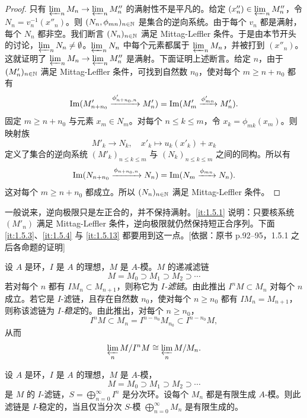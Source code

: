 \begin{proof}
只有 $\varprojlim_n M_n\to\varprojlim_n M''_n$ 的满射性不是平凡的。给定 $(x''_n)\in\varprojlim_n M''_n$，令 $N_n=v_n^{-1}(x''_n)$。则 $(N_n,\phi_{mn})_{n\in\mathbb{N}}$ 是集合的逆向系统。由于每个 $v_n$ 都是满射，每个 $N_n$ 都非空。我们断言 $(N_n)_{n\in\mathbb{N}}$ 满足 Mittag-Leffler 条件。于是由本节开头的讨论，$\varprojlim_n N_n\ne\emptyset$。$\varprojlim_n N_n$ 中每个元素都属于 $\varprojlim_n M_n$，并被打到 $(x''_n)$。这就证明了 $\varprojlim_n M_n\to\varprojlim_n M''_n$ 是满射。下面证明上述断言。给定 $n$，由于 $(M'_n)_{n\in\mathbb{N}}$ 满足 Mittag-Leffler 条件，可找到自然数 $n_0$，使对每个 $m\ge n+n_0$ 都有
\[
\operatorname{Im}(M'_{n+n_0}\xrightarrow{\phi'_{n+n_0,n}}M'_n)=\operatorname{Im}(M'_m\xrightarrow{\phi'_{mn}}M'_n).
\]
固定 $m\ge n+n_0$ 与元素 $x_m\in N_m$。对每个 $n\le k\le m$，令 $x_k=\phi_{mk}(x_m)$。则映射族
\[
M'_k\to N_k,\quad x'_k\mapsto u_k(x'_k)+x_k
\]
定义了集合的逆向系统 $(M'_k)_{n\le k\le m}$ 与 $(N_k)_{n\le k\le m}$ 之间的同构。所以有
\[
\operatorname{Im}(N_{n+n_0}\xrightarrow{\phi_{n+n_0,n}}N_n)=\operatorname{Im}(N_m\xrightarrow{\phi_{mn}}N_n).
\]
这对每个 $m\ge n+n_0$ 都成立。所以 $(N_n)_{n\in\mathbb{N}}$ 满足 Mittag-Leffler 条件。
\end{proof}
\begin{tnote}
一般说来，逆向极限只是左正合的，并不保持满射。\ref{it:1.5.1} 说明：只要核系统 $(M'_n)$ 满足 Mittag-Leffler 条件，逆向极限就仍然保持短正合序列。下面 \ref{it:1.5.3}、\ref{it:1.5.4} 与 \ref{it:1.5.13} 都要用到这一点。[依据：原书 p.92–95，1.5.1 之后各命题的证明]
\end{tnote}

设 $A$ 是环，$I$ 是 $A$ 的理想，$M$ 是 $A$-模。$M$ 的递减滤链
\[
M=M_0\supset M_1\supset M_2\supset\cdots
\]
若对每个 $n$ 都有 $IM_n\subset M_{n+1}$，则称它为 \emph{$I$-滤链}。由此推出 $I^nM\subset M_n$ 对每个 $n$ 成立。若它是 $I$-滤链，且存在自然数 $n_0$，使对每个 $n\ge n_0$ 都有 $IM_n=M_{n+1}$，则称该滤链为 \emph{$I$-稳定}的。由此推出，对每个 $n\ge n_0$，
\[
I^nM\subset M_n=I^{n-n_0}M_{n_0}\subset I^{n-n_0}M,
\]
从而
\[
\varprojlim_n M/I^nM\cong\varprojlim_n M/M_n.
\]

\begin{proposition}\label{it:1.5.2}
设 $A$ 是环，$I$ 是 $A$ 的理想，$M$ 是 $A$-模，
\[
M=M_0\supset M_1\supset M_2\supset\cdots
\]
是 $M$ 的 $I$-滤链，$S=\bigoplus_{n=0}^{\infty}I^n$ 是分次环。设每个 $M_n$ 都是有限生成 $A$-模。则此滤链是 $I$-稳定的，当且仅当分次 $S$-模 $\bigoplus_{n=0}^{\infty}M_n$ 是有限生成的。
\end{proposition}

